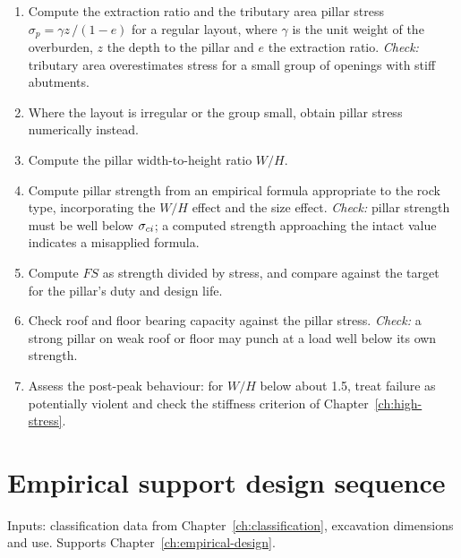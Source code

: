 \begin{enumerate}
  \item Compute the extraction ratio and the tributary area pillar stress
  $\sigma_p = \gamma z\,/(1-e)$ for a regular layout, where $\gamma$ is the
  unit weight of the overburden, $z$ the depth to the pillar and $e$ the
  extraction ratio.
  \emph{Check:} tributary area overestimates stress for a small group of
  openings with stiff abutments.
  \item Where the layout is irregular or the group small, obtain pillar stress
  numerically instead.
  \item Compute the pillar width-to-height ratio $W/H$.
  \item Compute pillar strength from an empirical formula appropriate to the
  rock type, incorporating the $W/H$ effect and the size effect.
  \emph{Check:} pillar strength must be well below $\sigma_{ci}$; a computed strength
  approaching the intact value indicates a misapplied formula.
  \item Compute $FS$ as strength divided by stress, and compare against the
  target for the pillar's duty and design life.
  \item Check roof and floor bearing capacity against the pillar stress.
  \emph{Check:} a strong pillar on weak roof or floor may punch at a load well
  below its own strength.
  \item Assess the post-peak behaviour: for $W/H$ below about 1.5, treat
  failure as potentially violent and check the stiffness criterion of
  Chapter~\ref{ch:high-stress}.
\end{enumerate}

\section{Empirical support design sequence}
\label{sec:seq-empirical}

Inputs: classification data from Chapter~\ref{ch:classification}, excavation
dimensions and use. Supports Chapter~\ref{ch:empirical-design}.

